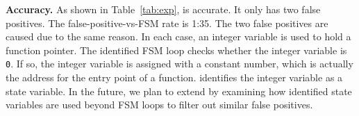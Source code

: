 \noindent\textbf{Accuracy.}
As shown in Table~\ref{tab:exp}, \Tool{} is accurate. 
It only has two false positives.
The false-positive-vs-FSM rate is 1:35. 
The two false positives are caused due to the same reason. 
In each case, an integer variable is used to hold a function pointer. 
The identified FSM loop checks whether the integer variable is \texttt{0}. 
If so, the integer variable is assigned with a constant number, 
which is actually the address for the entry point of a function. 
\Tool{} identifies the integer variable as a state variable.  
In the future, we plan to extend \Tool{} by examining how identified 
state variables are used beyond FSM 
loops to filter out similar false positives. 





